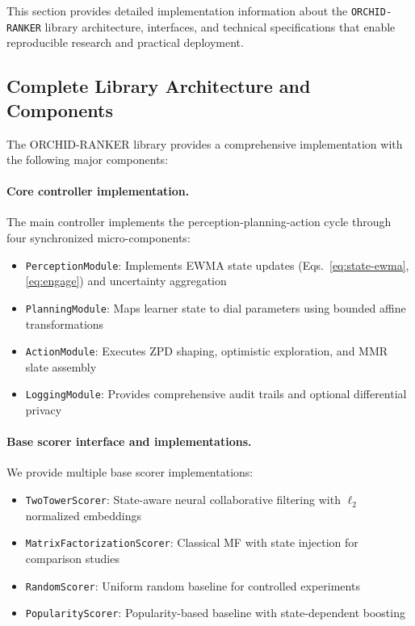 This section provides detailed implementation information about the \texttt{ORCHID-RANKER} library architecture, interfaces, and technical specifications that enable reproducible research and practical deployment.

\subsection{Complete Library Architecture and Components}
\label{app:library-architecture}

The \textsc{ORCHID-RANKER} library provides a comprehensive implementation with the following major components:

\paragraph{Core controller implementation.} The main controller implements the perception-planning-action cycle through four synchronized micro-components:
\begin{itemize}
  \item \texttt{PerceptionModule}: Implements EWMA state updates (Eqs.~\eqref{eq:state-ewma}, \eqref{eq:engage}) and uncertainty aggregation
  \item \texttt{PlanningModule}: Maps learner state to dial parameters using bounded affine transformations
  \item \texttt{ActionModule}: Executes ZPD shaping, optimistic exploration, and MMR slate assembly
  \item \texttt{LoggingModule}: Provides comprehensive audit trails and optional differential privacy
\end{itemize}

\paragraph{Base scorer interface and implementations.} We provide multiple base scorer implementations:
\begin{itemize}
  \item \texttt{TwoTowerScorer}: State-aware neural collaborative filtering with $\ell_2$ normalized embeddings
  \item \texttt{MatrixFactorizationScorer}: Classical MF with state injection for comparison studies
  \item \texttt{RandomScorer}: Uniform random baseline for controlled experiments
  \item \texttt{PopularityScorer}: Popularity-based baseline with state-dependent boosting
\end{itemize}

